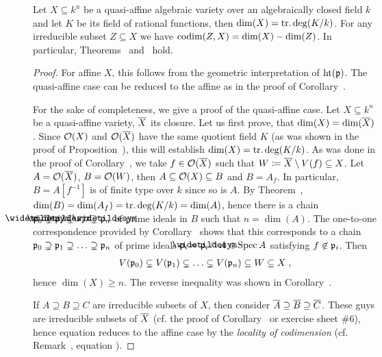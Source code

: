 \documentclass[a4paper,parskip=half,numbers=enddot, DIV=12]{scrreprt}
\renewcommand{\geq}{\geqslant}
\begin{document}
	\begin{cor}
		Let $X\subseteq k^n$ be a quasi-affine algebraic variety over an algebraically closed field $k$ and let $K$ be its field of rational functions, then $\dim (X) = \operatorname{tr.deg}(K/k)$. For any irreducible subset $Z\subseteq X$ we have $\operatorname{codim}(Z,X) = \dim (X)-\dim (Z)$. In particular, Theorems~ and~ hold.
	\end{cor}
	\begin{proof}
		For affine $X$, this follows from the geometric interpretation of $\operatorname{ht}(\mathfrak{p})$. The quasi-affine case can be reduced to the affine as in the proof of Corollary~.
		
		For the sake of completeness, we give a proof of the quasi-affine case. Let $X\subseteq k^n$ be a quasi-affine variety, $\overline X$ its closure. Let us first prove, that $\dim (X)=\dim(\overline X)$. Since $\mathcal{O}(X)$ and $\mathcal{O}(\overline X)$ have the same quotient field $K$ (as was shown in the proof of Proposition~), this will establish $\dim (X)=\operatorname{tr.deg}(K/k)$. As was done in the proof of Corollary~, we take $f\in \mathcal{O}(\overline X)$ such that $W\coloneqq\overline X\setminus V(f)\subseteq X$. Let $A=\mathcal{O}(\overline X)$, $B=\mathcal{O}(W)$, then $A\subseteq\mathcal{O}(X)\subseteq B$ and $B=A_f$. In particular, $B=A[f^{-1}]$ is of finite type over $k$ since so is $A$. By Theorem~, $\dim (B)=\dim (A_f)=\operatorname{tr.deg}(K/k)=\dim (A)$, hence there is a chain $\snake \pp_0\supsetneq\snake \pp_1\supsetneq\ldots\supsetneq\snake \pp_n$ of prime ideals in $B$ such that $n=\dim (A)$. The one-to-one correspondence provided by Corollary~ shows that this corresponds to a chain $\mathfrak{p}_0\supsetneq\mathfrak{p}_1\supsetneq\ldots\supsetneq\mathfrak{p}_n$ of prime ideals $\pp_i=\snake{\pp}_i\cap A\in\Spec A$ satisfying $f\not\in\mathfrak{p}_i$. Then
		\begin{align*}
			V(\mathfrak{p}_0)\subsetneq V(\mathfrak{p}_1)\subsetneq\ldots\subsetneq V(\mathfrak{p}_n)\subseteq W\subseteq X\;,
		\end{align*}
		 hence $\dim (X)\geq n$. The reverse inequality was shown in Corollary~.
		 
		 If $A\supseteq B\supseteq C$ are irreducible subsets of $X$, then consider $\overline A\supseteq\overline B\supseteq \overline C$. These guys are irreducible subsets of $\overline X$ (cf. the proof of Corollary~ or exercise sheet \#6), hence equation  reduces to the affine case by the \emph{locality of codimension} (cf. Remark~, equation ).
	\end{proof}
\end{document}
